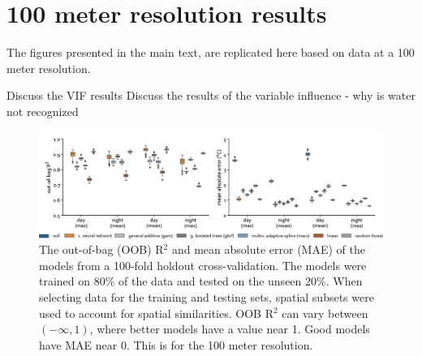 \documentclass[final,3p,times,twocolumn,sort&compress]{elsarticle}
\begin{document}
\newpage
\section{100 meter resolution results}
\label{ss:100_meter}
The figures presented in the main text, are replicated here based on data at a 100 meter resolution.

Discuss the VIF results
Discuss the results of the variable influence - why is water not recognized


\begin{figure}
    \centering
    \includegraphics[width=\linewidth]{fig/report/holdout_100.png}
    \caption[Holdout cross-validation results at 100 meter resolution]{
    The out-of-bag (OOB) R$^2$ and mean absolute error (MAE) of the models from a 100-fold holdout cross-validation. 
    The models were trained on 80\% of the data and tested on the unseen 20\%.
    When selecting data for the training and testing sets, spatial subsets were used to account for spatial similarities. 
    OOB R$^2$ can vary between $(-\infty, 1)$, where better models have a value near 1. 
    Good models have MAE near 0.
    This is for the 100 meter resolution.
    }
    \label{fig:holdout_100}
\end{figure}
\end{document}
